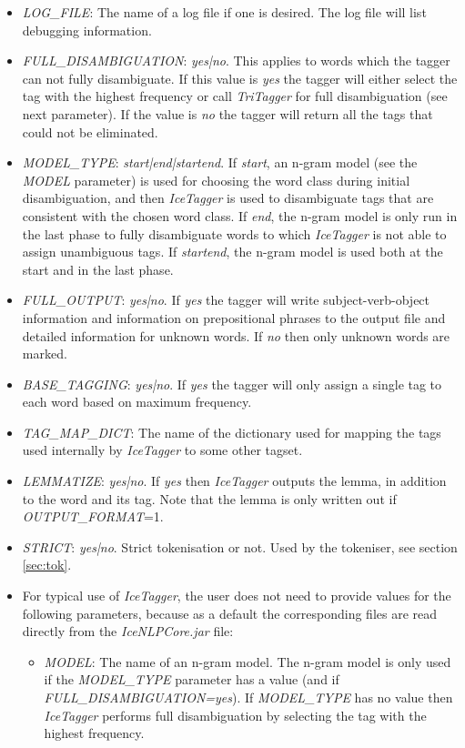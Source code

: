 \documentclass[11pt]{article}
\begin{document}
\begin{itemize}
\begin{itemize}
\item \emph{LOG\_FILE}: The name of a log file if one is desired. The log file will list debugging information.
\item \emph{FULL\_DISAMBIGUATION}: \emph{yes|no}. This applies to words which the tagger can not fully disambiguate. If this value is \emph{yes} the tagger will either select the tag with the highest frequency or call \emph{TriTagger} for full disambiguation (see next parameter). If the value is \emph{no} the tagger will return all the tags that could not be eliminated.
\item \emph{MODEL\_TYPE}: \emph{start|end|startend}. If \emph{start}, an n-gram model (see the \emph{MODEL} parameter) is used for choosing the word class during initial disambiguation, and then \textit{IceTagger} is used to disambiguate tags that are consistent with the chosen word class. If \emph{end}, the n-gram model is only run in the last phase to fully disambiguate words to which \emph{IceTagger} is not able to assign unambiguous tags.  If \emph{startend}, the n-gram model is used both at the start and in the last phase.  
\item \emph{FULL\_OUTPUT}: \emph{yes|no}. If \emph{yes} the tagger will write  subject-verb-object information and information on prepositional phrases to the output file and detailed information for unknown words. If \emph{no} then only unknown words are marked.
\item \emph{BASE\_TAGGING}: \emph{yes|no}. If \emph{yes} the tagger will only assign a single tag to each word based on maximum frequency.
\item \emph{TAG\_MAP\_DICT}: The name of the dictionary used for mapping the tags used internally by \textit{IceTagger} to some other tagset.
\item \emph{LEMMATIZE}: \emph{yes|no}. If \emph{yes} then \textit{IceTagger} outputs the lemma, in addition to the word and its tag. Note that the lemma is only written out if \emph{OUTPUT\_FORMAT}=1. 
\item \emph{STRICT}: \emph{yes|no}. Strict tokenisation or not. Used by the tokeniser, see section \ref{sec:tok}.
\item For typical use of \textit{IceTagger}, the user does not need to provide values for the following parameters, because as a default the corresponding files are read directly from the \emph{IceNLPCore.jar} file:
\begin{itemize}
\item \emph{MODEL}: The name of an n-gram model. The n-gram model is only used if the \emph{MODEL\_TYPE} parameter has a value (and if \emph{FULL\_DISAMBIGUATION=yes}). If \emph{MODEL\_TYPE} has no value then \emph{IceTagger} performs full disambiguation by selecting the tag with the highest frequency.

\end{itemize}
\end{itemize}
\end{itemize}
\end{document}
